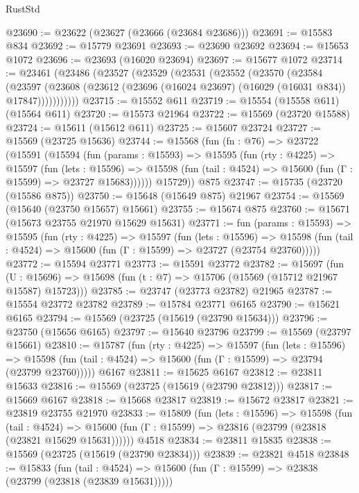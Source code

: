 \begin{lexlean}{RustStd}
\begin{coremodule}
@23690 := @23622 (@23627 (@23666 (@23684 @23686)))
@23691 := @15583 @834
@23692 := @15779 @23691
@23693 := @23690 @23692
@23694 := @15653 @1072
@23696 := @23693 (@16020 @23694)
@23697 := @15677 @1072
@23714 := @23461
    (@23486
      (@23527
        (@23529
          (@23531
            (@23552
              (@23570
                (@23584
                  (@23597
                    (@23608 (@23612 (@23696 (@16024 @23697) (@16029 (@16031 @834)) @17847)))))))))))
@23715 := @15552 @611
@23719 := @15554 (@15558 @611) (@15564 @611)
@23720 := @15573 @21964
@23722 := @15569 (@23720 @15588)
@23724 := @15611 (@15612 @611)
@23725 := @15607 @23724
@23727 := @15569 (@23725 @15636)
@23744 := @15568
    (fun (fn : @76) =>
    @23722
      (@15591
        (@15594
          (fun (params : @15593) =>
          @15595
            (fun (rty : @4225) =>
            @15597
              (fun (lets : @15596) =>
              @15598 (fun (tail : @4524) => @15600 (fun (Γ : @15599) => @23727 @15683))))))
        @15729))
    @875
@23747 := @15735 (@23720 (@15586 @875))
@23750 := @15648 (@15649 @875) @21967
@23754 := @15569 (@15640 (@23750 @15657) @15661)
@23755 := @15674 @875
@23760 := @15671 (@15673 @23755 @21970 @15629 @15631)
@23771 := fun (params : @15593) =>
  @15595
    (fun (rty : @4225) =>
    @15597
      (fun (lets : @15596) =>
      @15598 (fun (tail : @4524) => @15600 (fun (Γ : @15599) => @23727 (@23754 @23760)))))
@23772 := @15594 @23771
@23773 := @15591 @23772
@23782 := @15697
    (fun (U : @15696) => @15698 (fun (t : @7) => @15706 (@15569 (@15712 @21967 @15587) @15723)))
@23785 := @23747 (@23773 @23782) @21965
@23787 := @15554 @23772 @23782
@23789 := @15784 @23771 @6165
@23790 := @15621 @6165
@23794 := @15569 (@23725 (@15619 (@23790 @15634)))
@23796 := @23750 (@15656 @6165)
@23797 := @15640 @23796
@23799 := @15569 (@23797 @15661)
@23810 := @15787
    (fun (rty : @4225) =>
    @15597
      (fun (lets : @15596) =>
      @15598 (fun (tail : @4524) => @15600 (fun (Γ : @15599) => @23794 (@23799 @23760)))))
    @6167
@23811 := @15625 @6167
@23812 := @23811 @15633
@23816 := @15569 (@23725 (@15619 (@23790 @23812)))
@23817 := @15669 @6167
@23818 := @15668 @23817
@23819 := @15672 @23817
@23821 := @23819 @23755 @21970
@23833 := @15809
    (fun (lets : @15596) =>
    @15598
      (fun (tail : @4524) =>
      @15600 (fun (Γ : @15599) => @23816 (@23799 (@23818 (@23821 @15629 @15631))))))
    @4518
@23834 := @23811 @15835
@23838 := @15569 (@23725 (@15619 (@23790 @23834)))
@23839 := @23821 @4518
@23848 := @15833
    (fun (tail : @4524) => @15600 (fun (Γ : @15599) => @23838 (@23799 (@23818 (@23839 @15631)))))

\end{coremodule}
\end{lexlean}
